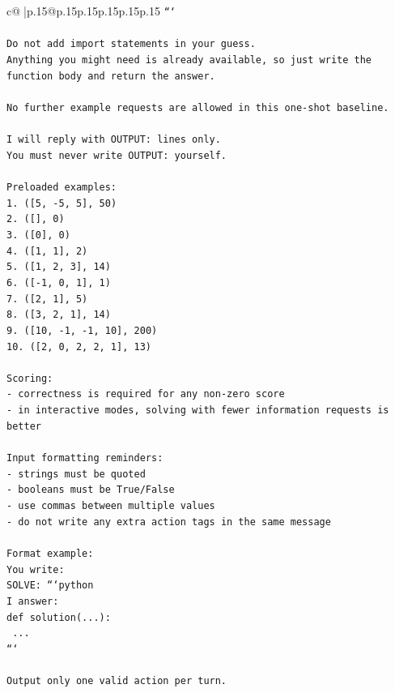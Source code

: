 \documentclass{article}
\begin{document}
{\begin{supertabular}{c@{$\;$}|p{.15\linewidth}@{}p{.15\linewidth}p{.15\linewidth}p{.15\linewidth}p{.15\linewidth}p{.15\linewidth}}
{{{\texttt{```} \\
\\ 
\texttt{Do not add import statements in your guess.} \\
\texttt{Anything you might need is already available, so just write the function body and return the answer.} \\
\\ 
\texttt{No further example requests are allowed in this one{-}shot baseline.} \\
\\ 
\texttt{I will reply with OUTPUT: lines only.} \\
\texttt{You must never write OUTPUT: yourself.} \\
\\ 
\texttt{Preloaded examples:} \\
\texttt{1. ({[}5, {-}5, 5{]}, 50)} \\
\texttt{2. ({[}{]}, 0)} \\
\texttt{3. ({[}0{]}, 0)} \\
\texttt{4. ({[}1, 1{]}, 2)} \\
\texttt{5. ({[}1, 2, 3{]}, 14)} \\
\texttt{6. ({[}{-}1, 0, 1{]}, 1)} \\
\texttt{7. ({[}2, 1{]}, 5)} \\
\texttt{8. ({[}3, 2, 1{]}, 14)} \\
\texttt{9. ({[}10, {-}1, {-}1, 10{]}, 200)} \\
\texttt{10. ({[}2, 0, 2, 2, 1{]}, 13)} \\
\\ 
\texttt{Scoring:} \\
\texttt{{-} correctness is required for any non{-}zero score} \\
\texttt{{-} in interactive modes, solving with fewer information requests is better} \\
\\ 
\texttt{Input formatting reminders:} \\
\texttt{{-} strings must be quoted} \\
\texttt{{-} booleans must be True/False} \\
\texttt{{-} use commas between multiple values} \\
\texttt{{-} do not write any extra action tags in the same message} \\
\\ 
\texttt{Format example:} \\
\texttt{You write:} \\
\texttt{SOLVE: ```python} \\
\texttt{I answer:} \\
\texttt{def solution(...):} \\
\texttt{    ...} \\
\texttt{```} \\
\\ 
\texttt{Output only one valid action per turn.} \\
            }
        }
    }
     \\ \\


\end{supertabular}}
\end{document}
